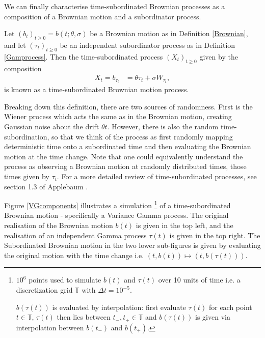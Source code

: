 \documentclass{article}
\begin{document}
We can finally characterise time-subordinated Brownian processes as a composition of a Brownian motion and a subordinator process.
\begin{definition}
    Let $(b_t)_{t\geq0} = b(t;\theta, \sigma)$ be a Brownian motion as in Definition \ref{Brownian},  and let $(\tau_t)_{t\geq0}$ be an independent subordinator process as in Definition \ref{Gamprocess}. Then the time-subordinated process $(X_t)_{t\geq0}$ given by the composition
    \begin{align}
        X_t = b_{\tau_t}
        &= \theta \tau_t + \sigma W_{\tau_t},\label{thetagammasigmawienergamma}
    \end{align}
    is known as a time-subordinated Brownian motion process.
\end{definition}
\begin{remark}
    Breaking down this definition, there are two sources of randomness. First is the Wiener process which acts the same as in the Brownian motion, creating Gaussian noise about the drift $\theta t$. However, there is also the random time-subordination, so that we think of the process as first randomly mapping deterministic time onto a subordinated time and then evaluating the Brownian motion at the time change. 
    Note that one could equivalently understand the process as observing a Brownian motion at randomly distributed times, those times given by $\tau_t$. 
    For a more detailed review of time-subordinated processes, see section 1.3 of Applebaum \cite{Applebaum}.
    
    Figure \ref{VGcomponents} illustrates a simulation
    \footnote{ 
        $10^6$ points used to simulate $b(t)$ and $\tau(t)$ over 10 units of time i.e. a discretization grid $\mathbb{T}$ with $\Delta t = 10^{-5}$. 
        
        $b(\tau(t))$ is evaluated by interpolation: first evaluate $\tau(t)$ for each point $t\in \mathbb{T}$, $\tau(t)$ then lies between $t_-, t_+\in \mathbb{T}$ and $b(\tau(t))$ is given via interpolation between $b(t_-)$ and $b(t_+)$.
    } 
    of a time-subordinated Brownian motion - specifically a Variance Gamma process. The original realisation of the Brownian motion $b(t)$ is given in the top left, and the realisation of an independent Gamma process $\tau(t)$ is given in the top right. The Subordinated Brownian motion in the two lower sub-figures is given by evaluating the original motion with the time change i.e. $(t,b(t)) \mapsto (t, b(\tau(t)))$.


\end{remark}
\end{document}
